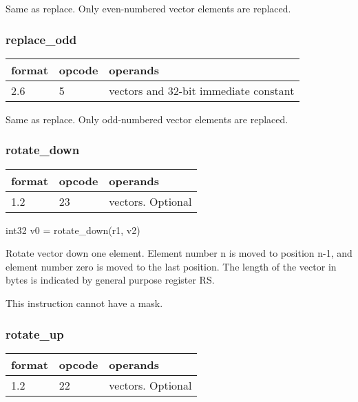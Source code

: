 \documentclass[forwardcom.tex]{subfiles}
\begin{document}
Same as replace. Only even-numbered vector elements are replaced.

\subsubsection{replace\_odd}
\label{table:replaceOddInstruction}
\begin{tabular}{|p{12mm}|p{12mm}|p{110mm}|}
\hline
\bfseries format & \bfseries opcode & \bfseries operands \\ \hline
2.6 & 5 & vectors and 32-bit immediate constant \\ \hline
\end{tabular}
\vspace{2mm}

Same as replace. Only odd-numbered vector elements are replaced.

\subsubsection{rotate\_down}
\label{table:rotateDownInstruction}
\begin{tabular}{|p{12mm}|p{12mm}|p{110mm}|}
\hline
\bfseries format & \bfseries opcode & \bfseries operands \\ \hline
1.2 & 23 & vectors. Optional \\ \hline
\end{tabular}
\vspace{2mm}

int32 v0 = rotate\_down(r1, v2)
\vspace{2mm}

Rotate vector down one element. Element number n is moved to position n-1, and element number zero is moved to the last position. The length of the vector in bytes is indicated by general purpose register RS.
\vspace{2mm}

This instruction cannot have a mask.

\subsubsection{rotate\_up}
\label{table:rotateUpInstruction}
\begin{tabular}{|p{12mm}|p{12mm}|p{110mm}|}
\hline
\bfseries format & \bfseries opcode & \bfseries operands \\ \hline
1.2 & 22 & vectors. Optional \\ \hline
\end{tabular}
\vspace{2mm}
\end{document}
